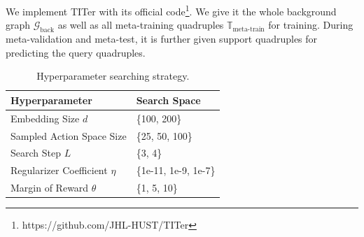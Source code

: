 \documentclass[runningheads]{llncs}
\begin{document}
We implement TITer with its official code\footnote{https://github.com/JHL-HUST/TITer}. We give it the whole background graph $\mathcal{G}_{\text{back}}$ as well as all meta-training quadruples $\mathbb{T}_{\text{meta-train}}$ for training. During meta-validation and meta-test, it is further given support quadruples for predicting the query quadruples.
\begin{table}[htbp]
    \caption{Hyperparameter searching strategy.}
        \label{tab: hyperparameter search}
      \centering
        \begin{tabular}{ll}
            \toprule %
       \textbf{Hyperparameter} & \textbf{Search Space} \\
       \midrule %
       Embedding Size $d$& \{100, 200\}     \\
       Sampled Action Space Size &  \{25, 50, 100\}   \\
       Search Step $L$ &  \{3, 4\}\\
       Regularizer Coefficient $\eta$ & \{1e-11, 1e-9, 1e-7\}\\
       Margin of Reward $\theta$ & \{1, 5, 10\}\\
       
      \bottomrule %
        \end{tabular}
\end{table}
\end{document}
